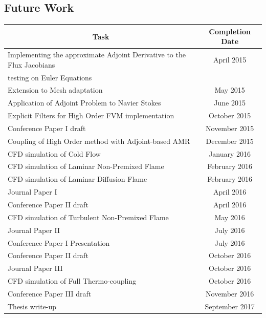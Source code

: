 \documentclass[titlepage,11pt,letterpaper]{article}
\begin{document}
\subsection{Future Work}

\begin{tabular}{|l|c|} \hline
\multicolumn{1}{|c|}{\bf{Task}} & \multicolumn{1}{|c|}{\bf{Completion Date}} \\

\hline Implementing the approximate Adjoint Derivative to the Flux Jacobians & April 2015 \\ testing on Euler Equations  &\\

\hline Extension to Mesh adaptation & May 2015\\

\hline Application of Adjoint Problem to Navier Stokes  & June 2015\\

\hline Explicit Filters for High Order FVM implementation  & October 2015\\

\hline Conference Paper I draft & November 2015\\

\hline Coupling of High Order method with Adjoint-based AMR & December 2015\\

\hline CFD simulation of Cold Flow & January 2016\\

\hline CFD simulation of Laminar Non-Premixed Flame & February 2016\\

\hline CFD simulation of Laminar Diffusion Flame & February 2016\\

\hline Journal Paper I & April 2016\\

\hline Conference Paper II draft & April 2016\\

\hline CFD simulation of Turbulent Non-Premixed Flame & May 2016\\

\hline Journal Paper II & July 2016\\

\hline Conference Paper I Presentation  & July 2016\\

\hline Conference Paper II draft  & October 2016\\

\hline Journal Paper III & October 2016\\

\hline CFD simulation of Full Thermo-coupling & October 2016\\

\hline Conference Paper III draft  & November 2016\\

\hline Thesis write-up & September 2017 \\ 

\hline

\end{tabular}

 
\end{document}
